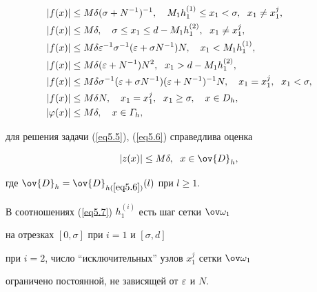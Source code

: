 \begin{equation}


\label{eq5.7}


\begin{split}


|f(x)|&\le M\delta(\sigma+N^{-1})^{-1},\quad


M_1 h_1^{(1)}\le x_1<\sigma,\ \; x_1\ne x_1^j,\\


|f(x)|&\le M\delta,\quad \sigma\le x_1\le d-M_1h_1^{(2)},


\ \; x_1\ne x_1^j,\\


|f(x)|&\le M\delta\eps^{-1}\sigma^{-1}(\eps+\sigma N^{-1})N,\quad


x_1< M_1h_1^{(1)},\\


|f(x)|&\le M\delta(\eps+N^{-1})N^2,\ \; x_1>d-M_1h_1^{(2)},\\


|f(x)|&\le M\delta\sigma^{-1}(\eps+\sigma N^{-1})(\eps+N^{-1})^{-1}N,\quad


x_1=x_1^j,\ \; x_1<\sigma,\\


|f(x)|&\le M\delta N,\quad x_1=x_1^j,\ \; x_1\ge\sigma,\quad x\in D_h,\\


|\f(x)|&\le M\delta,\quad x\in\varGamma_h,


\end{split}


\end{equation}


для решения задачи (\ref{eq5.5}), (\ref{eq5.6}) справедлива оценка


\begin{equation}


\label{eq5.8}


|z(x)|\le M\delta,\ \; x\in\ov{D}_h,


\end{equation}


где $\ov{D}_h=\ov{D}_{h(\ref{eq5.6})}(l)$ при $l\ge 1$.


В соотношениях (\ref{eq5.7}) $h_1^{(i)}$ есть шаг сетки $\ovo_1$


на отрезках $[0, \sigma]$ при $i=1$ и $[\sigma, d]$


при $i=2$, число ``исключительных'' узлов $x_1^j$ сетки $\ovo_1$


ограничено постоянной, не зависящей от $\varepsilon$ и $N$.





